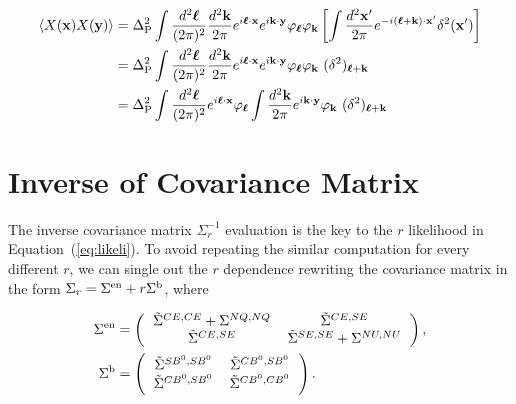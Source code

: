 \documentclass[aps, prd, reprint, nofootinbib, groupedaddress, showpacs]{revtex4-1}
\def\be{\begin{equation}}
\def\ee{\end{equation}}
\newcommand*\Bell{\ensuremath{\boldsymbol\ell}}
\begin{document}
\begin{widetext}
\be
\begin{aligned}
    \left< X(\mathbf x) X(\mathbf y)\right>
    &= \Delta_{\rm P}^2 \int \frac{d^2\Bell}{(2\pi)^2}
    \frac{d^2\mathbf k}{2\pi}     e^{i\Bell\cdot \mathbf x}
         e^{i\mathbf k\cdot \mathbf y}   \varphi_{\Bell}\varphi_{\mathbf k}
        \left[ \int \frac{d^2\mathbf x'}{2\pi}  e^{-i(\Bell + \mathbf k)\cdot \mathbf x'} \delta^2(\mathbf x') \right]\\
    &= \Delta_{\rm P}^2 \int \frac{d^2\Bell}{(2\pi)^2}
    \frac{d^2\mathbf k}{2\pi}     e^{i\Bell\cdot \mathbf x}
         e^{i\mathbf k\cdot \mathbf y}   \varphi_{\Bell}\varphi_{\mathbf k}\
          (\delta^2)_{\Bell + \mathbf k} \\
    &= \Delta_{\rm P}^2 \int \frac{d^2\Bell}{(2\pi)^2}
    e^{i\Bell\cdot \mathbf x} \varphi_{\Bell}
          \int \frac{d^2\mathbf k}{2\pi}
               e^{i\mathbf k\cdot \mathbf y}   \varphi_{\mathbf k}\
                (\delta^2)_{\Bell + \mathbf k}
\end{aligned}
\ee

\end{widetext}


\section{Inverse of Covariance Matrix}
\label{sec:app3}
The inverse covariance matrix $\Sigma_r^{-1}$ evaluation  is the key to
the $r$ likelihood in Equation~(\ref{eq:likeli}).
To avoid repeating the similar computation for every different $r$, we can single out the $r$ dependence
rewriting the covariance matrix in the form
$\Sigma_r = \Sigma^{\rm en} + r \Sigma^{\rm b}$,
where

\[
\begin{aligned}
\Sigma^{\rm en}
&=
\left(
\begin{tabular}{cc}
    $\tilde \Sigma^{CE,CE} + \Sigma^{NQ,NQ}$ & $\tilde\Sigma^{CE,SE}$ \\
    $\tilde \Sigma^{CE,SE}$ & $\tilde\Sigma^{SE,SE}+\Sigma^{NU, NU}$
\end{tabular}
\right), \\
\Sigma^{\rm b}
&=
\left(
\begin{tabular}{cc}
    $\tilde \Sigma^{SB^0,SB^0}$ & $\tilde \Sigma^{CB^0,SB^0}$ \\
    $\tilde \Sigma^{CB^0,SB^0}$ & $\tilde \Sigma^{CB^0,CB^0}$
\end{tabular}
\right).
\end{aligned}
\]
\end{document}
